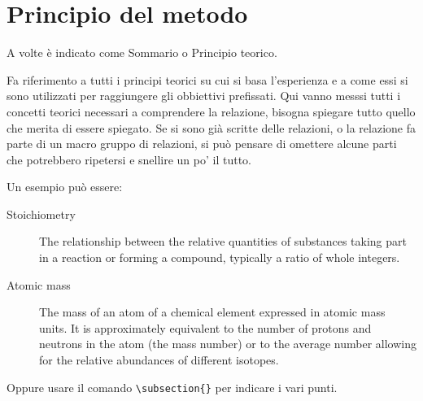 \section{Principio del metodo}
A volte è indicato come Sommario o Principio teorico.

Fa riferimento a tutti i principi teorici su cui si basa l'esperienza e a come essi si sono utilizzati per raggiungere gli obbiettivi prefissati. Qui vanno messsi tutti i concetti teorici necessari a comprendere la relazione, bisogna spiegare tutto quello che merita di essere spiegato. Se si sono già scritte delle relazioni, o la relazione fa parte di un macro gruppo di relazioni, si può pensare di omettere alcune parti che potrebbero ripetersi e snellire un po' il tutto.

Un esempio può essere:
\begin{description}
	\item[Stoichiometry] The relationship between the relative quantities of substances taking part in a reaction or forming a compound, typically a ratio of whole integers.
	\item[Atomic mass] The mass of an atom of a chemical element expressed in atomic mass units. It is approximately equivalent to the number of protons and neutrons in the atom (the mass number) or to the average number allowing for the relative abundances of different isotopes. 
\end{description} 

Oppure usare il comando \verb|\subsection{}| per indicare i vari punti.
